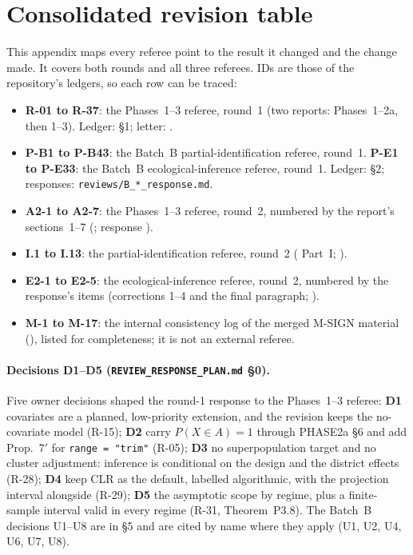 \section{Consolidated revision table}\label{app:revisions}

This appendix maps every referee point to the result it changed and the change
made. It covers both rounds and all three referees. IDs are those of the
repository's ledgers, so each row can be traced:
\begin{itemize}[nosep]
\item \textbf{R-01 to R-37}: the Phases~1--3 referee, round~1 (two reports:
Phases~1--2a, then 1--3). Ledger:  \S1;
letter: .
\item \textbf{P-B1 to P-B43}: the Batch~B partial-identification referee, round~1.
\textbf{P-E1 to P-E33}: the Batch~B ecological-inference referee, round~1.
Ledger:  \S2; responses:
\texttt{reviews/B\_*\_response.md}.
\item \textbf{A2-1 to A2-7}: the Phases~1--3 referee, round~2, numbered by the
report's sections~1--7 (;
response ).
\item \textbf{I.1 to I.13}: the partial-identification referee, round~2
( Part~I;
).
\item \textbf{E2-1 to E2-5}: the ecological-inference referee, round~2, numbered
by the response's items (corrections 1--4 and the final paragraph;
).
\item \textbf{M-1 to M-17}: the internal consistency log of the merged M-SIGN
material (), listed for completeness; it is not
an external referee.
\end{itemize}
\paragraph{Decisions D1--D5 (\texttt{REVIEW\_RESPONSE\_PLAN.md} \S0).} Five owner
decisions shaped the round-1 response to the Phases~1--3 referee:
\textbf{D1} covariates are a planned, low-priority extension, and the revision keeps
the no-covariate model (R-15); \textbf{D2} carry $P(X\in A)=1$ through PHASE2a \S6
and add Prop.~7$'$ for \texttt{range = "trim"} (R-05); \textbf{D3} no superpopulation
target and no cluster adjustment: inference is conditional on the design and the
district effects (R-28); \textbf{D4} keep CLR as the default, labelled algorithmic,
with the projection interval alongside (R-29); \textbf{D5} the asymptotic scope by
regime, plus a finite-sample interval valid in every regime (R-31, Theorem~P3.8).
The Batch~B decisions U1--U8 are in  \S5 and
are cited by name where they apply (U1, U2, U4, U6, U7, U8).

